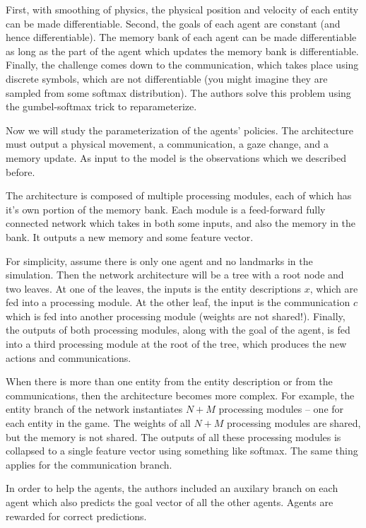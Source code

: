 \documentclass[12pt]{article}
\begin{document}
First, with smoothing of physics, the physical position and velocity of each entity can be made differentiable. Second, the goals of each agent are constant (and hence differentiable). The memory bank of each agent can be made differentiable as long as the part of the agent which updates the memory bank is differentiable. Finally, the challenge comes down to the communication, which takes place using discrete symbols, which are not differentiable (you might imagine they are sampled from some softmax distribution). The authors solve this problem using the gumbel-softmax trick to reparameterize.

Now we will study the parameterization of the agents' policies. The architecture must output a physical movement, a communication, a gaze change, and a memory update. As input to the model is the observations which we described before.

The architecture is composed of multiple processing modules, each of which has it's own portion of the memory bank. Each module is a feed-forward fully connected network which takes in both some inputs, and also the memory in the bank. It outputs a new memory and some feature vector.

For simplicity, assume there is only one agent and no landmarks in the simulation. Then the network architecture will be a tree with a root node and two leaves. At one of the leaves, the inputs is the entity descriptions $x$, which are fed into a processing module. At the other leaf, the input is the communication $c$ which is fed into another processing module (weights are not shared!). Finally, the outputs of both processing modules, along with the goal of the agent, is fed into a third processing module at the root of the tree, which produces the new actions and communications.

When there is more than one entity from the entity description or from the communications, then the architecture becomes more complex. For example, the entity branch of the network instantiates $N+M$ processing modules -- one for each entity in the game. The weights of all $N+M$ processing modules are shared, but the memory is not shared. The outputs of all these processing modules is collapsed to a single feature vector using something like softmax. The same thing applies for the communication branch.

In order to help the agents, the authors included an auxilary branch on each agent which also predicts the goal vector of all the other agents. Agents are rewarded for correct predictions.
\end{document}
